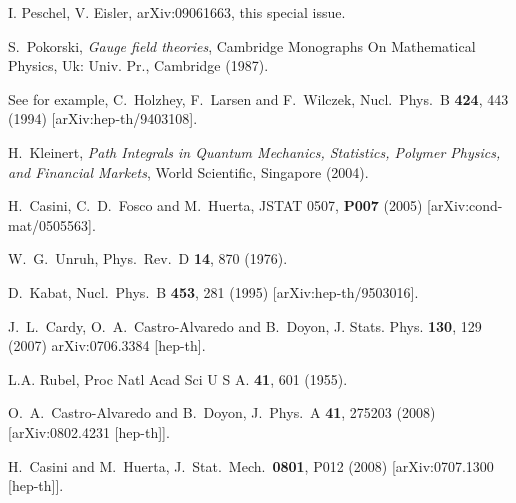 \documentclass[a4paper]{article}
\begin{document}
\begin{thebibliography}{99}
I. Peschel, V. Eisler, arXiv:09061663, this special issue.



  S.~Pokorski,
  {\sl Gauge field theories}, Cambridge Monographs On Mathematical Physics,
Uk: Univ. Pr., Cambridge (1987). 


 See for example, C.~Holzhey, F.~Larsen and F.~Wilczek,
 Nucl.\ Phys.\ B {\bf 424}, 443 (1994)
 [arXiv:hep-th/9403108].

  H.~Kleinert,
  {\sl Path Integrals in Quantum Mechanics,  Statistics, Polymer Physics,
  and Financial Markets}, 
  World Scientific, Singapore (2004).

  H.~Casini, C.~D.~Fosco and M.~Huerta, 
  JSTAT 0507, {\bf P007} (2005) [arXiv:cond-mat/0505563].


  W.~G.~Unruh,
  Phys.\ Rev.\  D {\bf 14}, 870 (1976).



   D.~Kabat,
  Nucl.\ Phys.\ B {\bf 453}, 281 (1995)
  [arXiv:hep-th/9503016].

  
  J.~L.~Cardy, O.~A.~Castro-Alvaredo and B.~Doyon,
   J. Stats. Phys. {\bf 130},  129 (2007)  
  arXiv:0706.3384 [hep-th].


L.A. Rubel,
 Proc Natl Acad Sci U S A. {\bf 41}, 601 (1955). 


  O.~A.~Castro-Alvaredo and B.~Doyon,
  J.\ Phys.\ A  {\bf 41}, 275203 (2008)
  [arXiv:0802.4231 [hep-th]].



  H.~Casini and M.~Huerta,
  J.\ Stat.\ Mech.\  {\bf 0801}, P012 (2008)
  [arXiv:0707.1300 [hep-th]].






\end{thebibliography}
\end{document}
